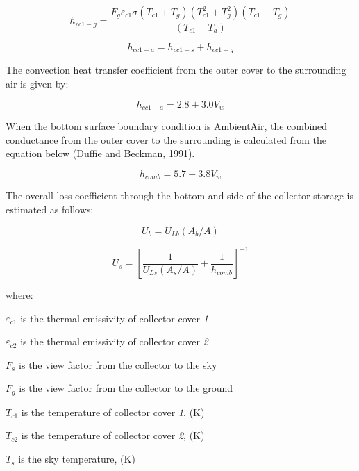 \begin{equation}
{h_{rc1 - g}} = \frac{{{F_g}{\varepsilon_{c1}}\sigma \left( {{T_{c1}} + {T_g}} \right)\left( {T_{c1}^2 + T_g^2} \right)\left( {{T_{c1}} - {T_g}} \right)}}{{\left( {{T_{c1}} - {T_a}} \right)}}
\end{equation}

\begin{equation}
{h_{cc1 - a}} = {h_{cc1 - s}} + {h_{cc1 - g}}
\end{equation}

The convection heat transfer coefficient from the outer cover to the surrounding air is given by:

\begin{equation}
{h_{cc1 - a}} = 2.8 + 3.0{V_w}
\end{equation}

When the bottom surface boundary condition is AmbientAir, the combined conductance from the outer cover to the surrounding is calculated from the equation below (Duffie and Beckman, 1991).

\begin{equation}
{h_{comb}} = 5.7 + 3.8{V_w}
\end{equation}

The overall loss coefficient through the bottom and side of the collector-storage is estimated as follows:

\begin{equation}
{U_b} = {U_{Lb}}\left( {{A_b}/A} \right)
\end{equation}

\begin{equation}
{U_s} = {\left[ {\frac{1}{{{U_{Ls}}\left( {{A_s}/A} \right)}} + \frac{1}{{{h_{comb}}}}} \right]^{ - 1}}
\end{equation}

where:

\({\varepsilon}_{c1}\) is the thermal emissivity of collector cover \emph{1}

\({\varepsilon}_{c2}\) is the thermal emissivity of collector cover \emph{2}

\(F_{s}\) is the view factor from the collector to the sky

\(F_{g}\) is the view factor from the collector to the ground

\(T_{c1}\) is the temperature of collector cover \emph{1}, (K)

\(T_{c2}\) is the temperature of collector cover \emph{2}, (K)

\(T_{s}\) is the sky temperature, (K)

